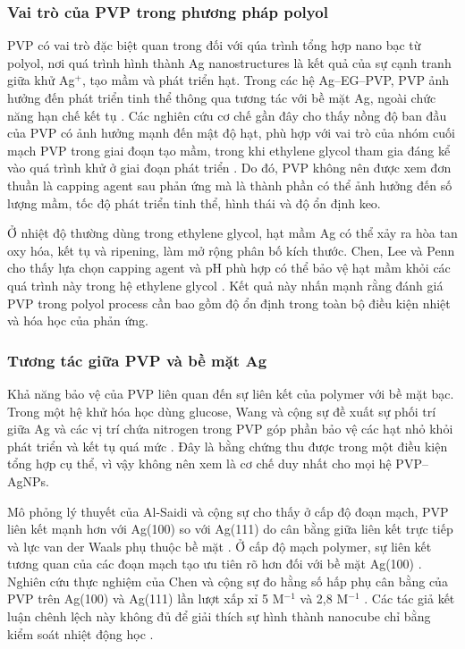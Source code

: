 \subsubsection{Vai trò của PVP trong phương pháp polyol}
PVP có vai trò đặc biệt quan trong đối với qúa trình tổng hợp nano bạc từ polyol, nơi quá trình hình thành Ag nanostructures là kết quả của sự cạnh tranh giữa khử Ag$^+$, tạo mầm và phát triển hạt.
Trong các hệ Ag--EG--PVP, PVP ảnh hưởng đến phát triển tinh thể thông qua tương tác với bề mặt Ag, ngoài chức năng hạn chế kết tụ \parencite{wiley2005,chen2019}.
Các nghiên cứu cơ chế gần đây cho thấy nồng độ ban đầu của PVP có ảnh hưởng mạnh đến mật độ hạt, phù hợp với vai trò của nhóm cuối mạch PVP trong giai đoạn tạo mầm, trong khi ethylene glycol tham gia đáng kể vào quá trình khử ở giai đoạn phát triển \parencite{canning2025}.
Do đó, PVP không nên được xem đơn thuần là capping agent sau phản ứng mà là thành phần có thể ảnh hưởng đến số lượng mầm, tốc độ phát triển tinh thể, hình thái và độ ổn định keo.
\par
Ở nhiệt độ thường dùng trong ethylene glycol, hạt mầm Ag có thể xảy ra hòa tan oxy hóa, kết tụ và ripening, làm mở rộng phân bố kích thước.
Chen, Lee và Penn cho thấy lựa chọn capping agent và pH phù hợp có thể bảo vệ hạt mầm khỏi các quá trình này trong hệ ethylene glycol \parencite{chen2019eg}.
Kết quả này nhấn mạnh rằng đánh giá PVP trong polyol process cần bao gồm độ ổn định trong toàn bộ điều kiện nhiệt và hóa học của phản ứng.
\subsubsection{Tương tác giữa PVP và bề mặt Ag}
Khả năng bảo vệ của PVP liên quan đến sự liên kết của polymer với bề mặt bạc.
Trong một hệ khử hóa học dùng glucose, Wang và cộng sự đề xuất sự phối trí giữa Ag và các vị trí chứa nitrogen trong PVP góp phần bảo vệ các hạt nhỏ khỏi phát triển và kết tụ quá mức \parencite{wang2005}.
Đây là bằng chứng thu được trong một điều kiện tổng hợp cụ thể, vì vậy không nên xem là cơ chế duy nhất cho mọi hệ PVP--AgNPs.
\par
Mô phỏng lý thuyết của Al-Saidi và cộng sự cho thấy ở cấp độ đoạn mạch, PVP liên kết mạnh hơn với Ag(100) so với Ag(111) do cân bằng giữa liên kết trực tiếp và lực van der Waals phụ thuộc bề mặt \parencite{alsaidi2012}.
Ở cấp độ mạch polymer, sự liên kết tương quan của các đoạn mạch tạo ưu tiên rõ hơn đối với bề mặt Ag(100) \parencite{alsaidi2012}.
Nghiên cứu thực nghiệm của Chen và cộng sự đo hằng số hấp phụ cân bằng của PVP trên Ag(100) và Ag(111) lần lượt xấp xỉ 5 M$^{-1}$ và 2,8 M$^{-1}$ \parencite{chen2019}.
Các tác giả kết luận chênh lệch này không đủ để giải thích sự hình thành nanocube chỉ bằng kiểm soát nhiệt động học \parencite{chen2019}.
